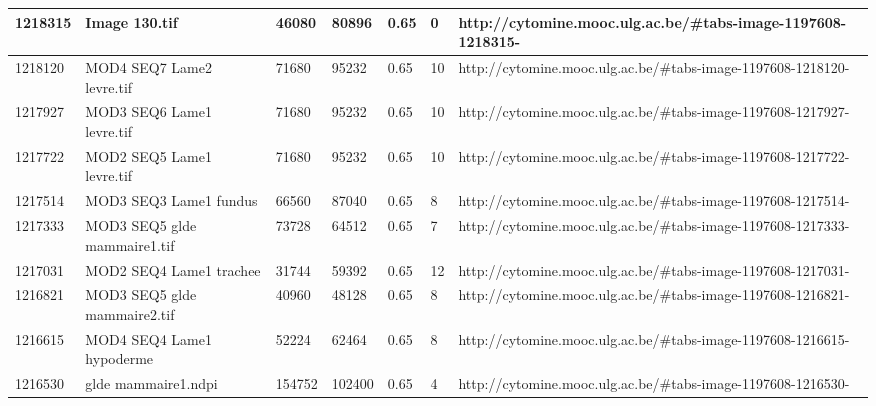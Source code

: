 \documentclass[a4paper,11pt]{report}
\numberwithin{figure}{chapter} %
\begin{document}
\begin{table}[]
{\begin{tabular}{|l|l|l|l|l|l|l|}
1218315  & Image 130.tif                                                                                & 46080  & 80896  & 0.65                  & 0           & http://cytomine.mooc.ulg.ac.be/\#tabs-image-1197608-1218315-  \\ \hline
1218120  & MOD4 SEQ7 Lame2 levre.tif                                                                    & 71680  & 95232  & 0.65                  & 10          & http://cytomine.mooc.ulg.ac.be/\#tabs-image-1197608-1218120-  \\ \hline
1217927  & MOD3 SEQ6 Lame1 levre.tif                                                                    & 71680  & 95232  & 0.65                  & 10          & http://cytomine.mooc.ulg.ac.be/\#tabs-image-1197608-1217927-  \\ \hline
1217722  & MOD2 SEQ5 Lame1 levre.tif                                                                    & 71680  & 95232  & 0.65                  & 10          & http://cytomine.mooc.ulg.ac.be/\#tabs-image-1197608-1217722-  \\ \hline
1217514  & MOD3 SEQ3 Lame1 fundus                                                                       & 66560  & 87040  & 0.65                  & 8           & http://cytomine.mooc.ulg.ac.be/\#tabs-image-1197608-1217514-  \\ \hline
1217333  & MOD3 SEQ5 glde mammaire1.tif                                                                 & 73728  & 64512  & 0.65                  & 7           & http://cytomine.mooc.ulg.ac.be/\#tabs-image-1197608-1217333-  \\ \hline
1217031  & MOD2 SEQ4 Lame1 trachee                                                                      & 31744  & 59392  & 0.65                  & 12          & http://cytomine.mooc.ulg.ac.be/\#tabs-image-1197608-1217031-  \\ \hline
1216821  & MOD3 SEQ5 glde mammaire2.tif                                                                 & 40960  & 48128  & 0.65                  & 8           & http://cytomine.mooc.ulg.ac.be/\#tabs-image-1197608-1216821-  \\ \hline
1216615  & MOD4 SEQ4 Lame1 hypoderme                                                                    & 52224  & 62464  & 0.65                  & 8           & http://cytomine.mooc.ulg.ac.be/\#tabs-image-1197608-1216615-  \\ \hline
1216530  & glde mammaire1.ndpi                                                                          & 154752 & 102400 & 0.65                  & 4           & http://cytomine.mooc.ulg.ac.be/\#tabs-image-1197608-1216530-  \\ \hline

\end{tabular}}
\end{table}
\end{document}
